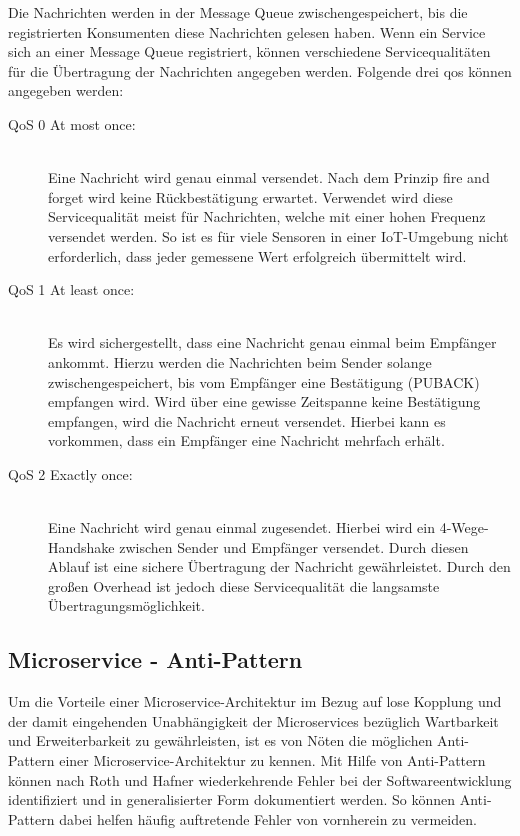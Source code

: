 Die Nachrichten werden in der Message Queue zwischengespeichert, bis die registrierten Konsumenten diese Nachrichten gelesen haben. Wenn ein Service sich an einer Message Queue registriert, können verschiedene Servicequalitäten für die Übertragung der Nachrichten angegeben werden. Folgende drei \glqq \gls{qos}\grqq{} können angegeben werden: \cite{ApacheSoftwareFoundation.2021}

\begin{description}
    \item[QoS 0 \glqq At most once\grqq{}:]\hfill \\
    Eine Nachricht wird genau einmal versendet. Nach dem Prinzip \glqq fire and forget\grqq{} wird keine Rückbestätigung erwartet. Verwendet wird diese Servicequalität meist für Nachrichten, welche mit einer hohen Frequenz versendet werden. So ist es für viele Sensoren in einer IoT-Umgebung nicht erforderlich, dass jeder gemessene Wert erfolgreich übermittelt wird.
    
    \item[QoS 1 \glqq At least once\grqq{}:]\hfill \\
    Es wird sichergestellt, dass eine Nachricht genau einmal beim Empfänger ankommt. Hierzu werden die Nachrichten beim Sender solange zwischengespeichert, bis vom Empfänger eine Bestätigung (PUBACK) empfangen wird. Wird über eine gewisse Zeitspanne keine Bestätigung empfangen, wird die Nachricht erneut versendet. Hierbei kann es vorkommen, dass ein Empfänger eine Nachricht mehrfach erhält. \cite{FlorianRaschbichler.2017}
    
    \item[QoS 2 \glqq Exactly once\grqq{}:]\hfill \\
    Eine Nachricht wird genau einmal zugesendet. Hierbei wird ein 4-Wege-Handshake zwischen Sender und Empfänger versendet. Durch diesen Ablauf ist eine sichere Übertragung der Nachricht gewährleistet. Durch den großen Overhead ist jedoch diese Servicequalität die langsamste Übertragungsmöglichkeit.

\end{description}

\subsection{Microservice - Anti-Pattern\label{subsec2.3.2:Unterunterpunkt-2}}

Um die Vorteile einer Microservice-Architektur im Bezug auf lose Kopplung und der damit eingehenden Unabhängigkeit der Microservices bezüglich Wartbarkeit und Erweiterbarkeit zu gewährleisten, ist es von Nöten die möglichen Anti-Pattern einer Microservice-Architektur zu kennen. Mit Hilfe von Anti-Pattern können nach Roth und Hafner \cite{StephanRoth.2019} wiederkehrende Fehler bei der Softwareentwicklung identifiziert und in generalisierter Form dokumentiert werden. So können Anti-Pattern dabei helfen häufig auftretende Fehler von vornherein zu vermeiden.

